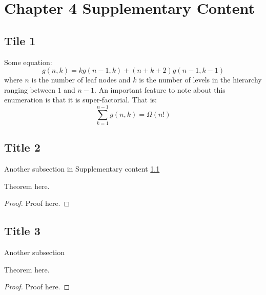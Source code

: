 \chapter{Chapter 4 Supplementary Content}\label{app:suppcontent}
\newpage
\section{Tile 1}\label{app:Chapter2}
Some equation:
\begin{equation}
g(n,k) = kg(n-1,k)+(n+k+2)g(n-1,k-1)
\end{equation}
where $n$ is the number of leaf nodes and $k$ is the number of levels in the hierarchy ranging between $1$ and $n-1$. An important feature to note about this enumeration is that it is super-factorial. That is:
\begin{equation}
\sum_{k=1}^{n-1} g(n,k) = \Omega (n!)
\end{equation}

\section{Title 2}\label{app:Chapter3}

Another subsection in Supplementary content \ref{app:Chapter2}

\begin{theorem}
Theorem here.
\end{theorem}

\begin{proof}
    Proof here.
\end{proof}

\section{Title 3}\label{app:Chapter4}

Another subsection

\begin{theorem}
Theorem here.
\end{theorem}

\begin{proof}
    Proof here.
\end{proof}